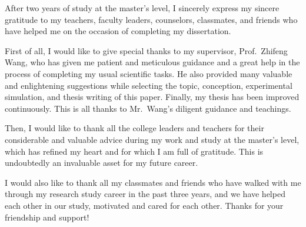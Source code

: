 
\begin{acknowledgments}




    After two years of study at the master's level, I sincerely express my sincere gratitude to my teachers, faculty leaders, counselors, classmates, and friends who have helped me on the occasion of completing my dissertation.

    First of all, I would like to give special thanks to my supervisor, Prof.\ Zhifeng Wang, who has given me patient and meticulous guidance and a great help in the process of completing my usual scientific tasks. He also provided many valuable and enlightening suggestions while selecting the topic, conception, experimental simulation, and thesis writing of this paper. Finally, my thesis has been improved continuously. This is all thanks to Mr.\ Wang's diligent guidance and teachings.

    Then, I would like to thank all the college leaders and teachers for their considerable and valuable advice during my work and study at the master's level, which has refined my heart and for which I am full of gratitude. This is undoubtedly an invaluable asset for my future career.

    I would also like to thank all my classmates and friends who have walked with me through my research study career in the past three years, and we have helped each other in our study, motivated and cared for each other. Thanks for your friendship and support!

\end{acknowledgments}
